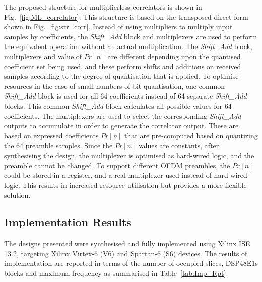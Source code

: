 The proposed structure for multiplierless correlators is shown in Fig.~\ref{fig:ML_correlator}.
This structure is based on the transposed direct form shown in Fig.~\ref{fig:str_corr}.
Instead of using multipliers to multiply input samples by coefficients, the \emph{Shift\_Add} block and multiplexers are used to perform the equivalent operation without an actual multiplication.
The \emph{Shift\_Add} block, multiplexers and value of $Pr[n]$ are different depending upon the quantised coefficient set being used, and these perform shifts and additions on received samples according to the degree of quantisation that is applied.
To optimise resources in the case of small numbers of bit quantisation, one common \emph{Shift\_Add} block is used for all 64 coefficients instead of 64 separate \emph{Shift\_Add} blocks.
This common \emph{Shift\_Add} block calculates all possible values for 64 coefficients.
The multiplexers are used to select the corresponding \emph{Shift\_Add} outputs to accumulate in order to generate the correlator output.
These are based on expressed coefficients $Pr[n]$ that are pre-computed based on quantizing the 64 preamble samples.
Since the $Pr[n]$ values are constants, after synthesising the design, the multiplexer is optimised as hard-wired logic, and the preamble cannot be changed.
To support different OFDM preambles, the $Pr[n]$ could be stored in a register, and a real multiplexer used instead of hard-wired logic.
This results in increased resource utilisation but provides a more flexible solution.

\subsection{Implementation Results}

The designs presented were synthesised and fully implemented using Xilinx ISE 13.2, targeting Xilinx Virtex-6 (V6) and Spartan-6 (S6) devices.
The results of implementation are reported in terms of the number of occupied slices, DSP48E1s blocks and maximum frequency as summarised in Table~\ref{tab:Imp_Rpt}.

